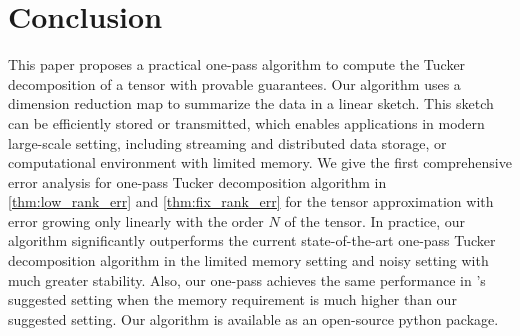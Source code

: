 \section{Conclusion}
This paper proposes a practical one-pass algorithm to compute the
Tucker decomposition of a tensor with provable guarantees.
Our algorithm uses a dimension reduction map to summarize the data in a linear sketch.
This sketch can be efficiently stored or transmitted, which enables applications in modern large-scale setting, including streaming and distributed data storage, or computational environment with limited memory.
We give the first comprehensive error analysis for one-pass Tucker decomposition algorithm in \ref{thm:low_rank_err}
and \ref{thm:fix_rank_err} for the tensor
approximation with error growing only linearly with the order $N$ of the tensor. In practice, our algorithm significantly outperforms the current state-of-the-art one-pass Tucker decomposition algorithm \cite{malik2018low} in the limited memory setting and noisy setting with much greater stability. Also, our one-pass achieves the same performance in \cite{malik2018low}'s suggested setting when the memory requirement is much higher than our suggested setting.
Our algorithm is available as an open-source python package.

